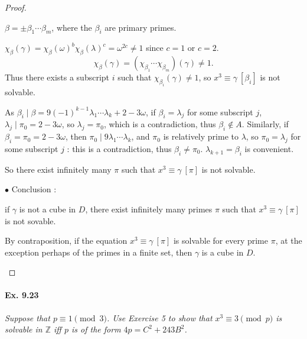 \documentclass[11pt,a4paper]{article}
\newcommand{\Z}{\mathbb{Z}}
\begin{document}
\begin{proof}
\begin{enumerate}
$\beta = \pm\beta_1\cdots\beta_m$, where the $\beta_i$ are primary primes.

$\chi_\beta(\gamma) = \chi_\beta(\omega)^b \chi_\beta(\lambda)^c = \omega^{2c} \neq 1$ since $c = 1$ or $c = 2$.
$$\chi_\beta(\gamma) = (\chi_{\beta_1}\cdots \chi_{\beta_m})(\gamma) \neq 1. $$ Thus there exists a subscript $i$ such that $\chi_{\beta_i}(\gamma) \ne 1$, so $x^3 \equiv \gamma\ [\beta_i]$ is not solvable. 

As $\beta_i \mid \beta = 9 (-1)^{k-1} \lambda_1\cdots \lambda_k + 2-3\omega$, if $\beta_i = \lambda_j$ for some subscript $j$, $\lambda_j \mid \pi_0 = 2 - 3\omega$, so $\lambda_j = \pi_0$, which is a contradiction, thus $\beta_i \not \in A$. Similarly, if  $\beta_i = \pi_0 = 2 - 3\omega$, then $\pi_0 \mid 9 \lambda_1\cdots\lambda_k$, and $\pi_0$ is relatively prime to $\lambda$, so $\pi_0 = \lambda_j$ for some subscript $j$ : this is a contradiction, thus $\beta_i \ne \pi_0$. $\lambda_{k+1} = \beta_i$ is convenient.

So there exist infinitely many $\pi$ such that $x^3 \equiv \gamma \ [\pi]$ is not solvable.

$\bullet$ Conclusion :

if $\gamma$ is not a cube in $D$, there exist infinitely many primes $\pi$ such that $x^3 \equiv \gamma \ [\pi]$ is not sovable.

By contraposition, if the equation $x^3 \equiv \gamma \ [\pi]$ is solvable for every prime $\pi$, at the exception perhaps of the primes in a finite set, then $\gamma$ is a cube in $D$.

\end{enumerate}
\end{proof}

\paragraph{Ex. 9.23}

{\it Suppose that $p\equiv 1 \pmod 3$. Use Exercise 5 to show that $x^3 \equiv 3 \pmod p$ is solvable in $\Z$ iff $p$ is of the form $4p = C^2 + 243 B^2$.
}
\end{document}
